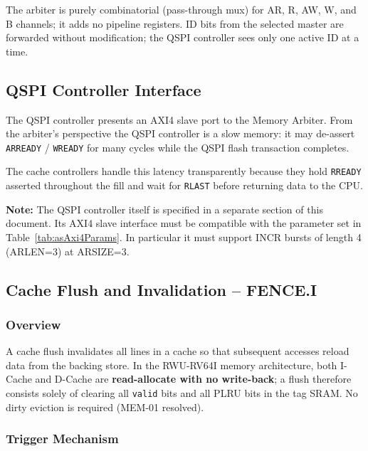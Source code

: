 The arbiter is purely combinatorial (pass-through mux) for AR, R, AW, W,
and B channels; it adds no pipeline registers.
ID bits from the selected master are forwarded without modification;
the QSPI controller sees only one active ID at a time.

\subsection{QSPI Controller Interface}

The QSPI controller presents an AXI4 slave port to the Memory Arbiter.
From the arbiter's perspective the QSPI controller is a slow memory:
it may de-assert \texttt{ARREADY} / \texttt{WREADY} for many cycles while
the QSPI flash transaction completes.

The cache controllers handle this latency transparently because they hold
\texttt{RREADY} asserted throughout the fill and wait for \texttt{RLAST}
before returning data to the CPU.

\textbf{Note:} The QSPI controller itself is specified in a separate
section of this document.
Its AXI4 slave interface must be compatible with the parameter set in
Table~\ref{tab:asAxi4Params}.
In particular it must support INCR bursts of length 4 (ARLEN=3) at
ARSIZE=3.

\subsection{Cache Flush and Invalidation -- FENCE.I}
\label{subsec:cacheFlush}

\subsubsection{Overview}

A cache flush invalidates all lines in a cache so that subsequent accesses
reload data from the backing store.
In the RWU-RV64I memory architecture, both I-Cache and D-Cache are
\textbf{read-allocate with no write-back}; a flush therefore consists
solely of clearing all \texttt{valid} bits and all PLRU bits in the tag
SRAM.
No dirty eviction is required (MEM-01 resolved).

\subsubsection{Trigger Mechanism}

